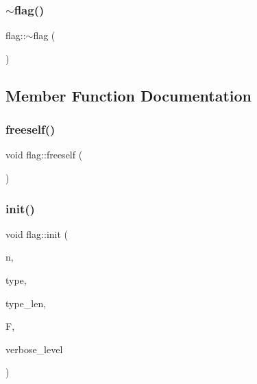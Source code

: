 \mbox{\label{classflag_a9149bfdf4e5ec69255d353088869e9a0}} 
\subsubsection{\texorpdfstring{$\sim$flag()}{~flag()}}
{\footnotesize\ttfamily flag\+::$\sim$flag (\begin{DoxyParamCaption}{ }\end{DoxyParamCaption})}



\subsection{Member Function Documentation}
\mbox{\label{classflag_ade1fe610c12390f167cd1d3691a141c1}} 
\subsubsection{\texorpdfstring{freeself()}{freeself()}}
{\footnotesize\ttfamily void flag\+::freeself (\begin{DoxyParamCaption}{ }\end{DoxyParamCaption})}

\mbox{\label{classflag_a1a6bdc10c3a544607a7a3a6672e3c773}} 
\subsubsection{\texorpdfstring{init()}{init()}}
{\footnotesize\ttfamily void flag\+::init (\begin{DoxyParamCaption}\item[{\mbox{\hyperlink{galois_8h_a09fddde158a3a20bd2dcadb609de11dc}{I\+NT}}}]{n,  }\item[{\mbox{\hyperlink{galois_8h_a09fddde158a3a20bd2dcadb609de11dc}{I\+NT}} $\ast$}]{type,  }\item[{\mbox{\hyperlink{galois_8h_a09fddde158a3a20bd2dcadb609de11dc}{I\+NT}}}]{type\+\_\+len,  }\item[{\mbox{\hyperlink{classfinite__field}{finite\+\_\+field}} $\ast$}]{F,  }\item[{\mbox{\hyperlink{galois_8h_a09fddde158a3a20bd2dcadb609de11dc}{I\+NT}}}]{verbose\+\_\+level }\end{DoxyParamCaption})}

